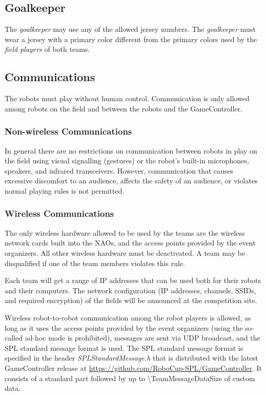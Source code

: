 \subsection{Goalkeeper}
\label{sec:goalkeeper}

The \emph{goalkeeper} may use any of the allowed jersey numbers. The \emph{goalkeeper} must wear a jersey with a primary color different from the primary colors used by the \emph{field players} of both teams.

\subsection{Communications}

The robots must play without human control. Communication is only allowed among robots on the field and between the robots and the GameController.

\subsubsection{Non-wireless Communications}
\label{sec:acoustic}
In general there are no restrictions on communication between robots in play on the field using visual signalling (\eg gestures) or the robot's built-in microphones, speakers, and infrared transceivers. However, communication that causes excessive discomfort to an audience, affects the safety of an audience, or violates normal playing rules is not permitted.

\subsubsection{Wireless Communications}
\label{sec:wireless}
The only wireless hardware allowed to be used by the teams are the wireless network cards built into the NAOs, and the access points provided by the event organizers. All other wireless hardware must be deactivated. A team may be disqualified if one of the team members violates this rule.

Each team will get a range of IP addresses that can be used both for their robots and their computers. The network configuration (\eg IP addresses, channels, SSIDs, and required encryption) of the fields will be announced at the competition site.

Wireless robot-to-robot communication among the robot players is allowed, as long as it uses the access points provided by the event organizers (using the so-called ad-hoc mode is prohibited), messages are sent via UDP broadcast, and the SPL standard message format is used. The SPL standard message format is specified in the header \emph{SPLStandardMessage.h} that is distributed with the latest GameController release at \url{https://github.com/RoboCup-SPL/GameController}. It consists of a standard part followed by up to \qty{\TeamMessageDataSize}{\byte} of custom data.

